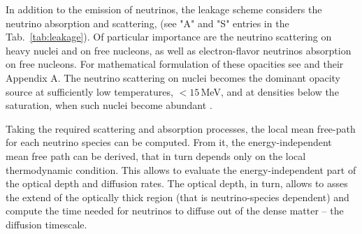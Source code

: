 In addition to the emission of neutrinos, the leakage scheme considers the neutrino absorption 
and scattering, (see "A" and "S" entries in the Tab.~\ref{tab:leakage}).
%
Of particular importance are the neutrino scattering on heavy nuclei and on free nucleons, 
as well as electron-flavor neutrinos absorption on free nucleons. 
For mathematical formulation of these opacities see \citet{Galeazzi:2013mia} 
and their Appendix A.
%
The neutrino scattering on nuclei becomes the dominant opacity source 
at sufficiently low temperatures, $<15\,$MeV, and at densities below 
the saturation, when such nuclei become abundant \citep{Rosswog:2003rv}.

Taking the required scattering and absorption processes, the local mean 
free-path for each neutrino species can be computed. From it, the 
energy-independent mean free path can be derived, that in turn depends 
only on the local thermodynamic condition. This allows to evaluate the 
energy-independent part of the optical depth and diffusion rates.
%
The optical depth, in turn, allows to asses the extend of the optically thick region 
(that is neutrino-species dependent) and compute the time needed 
for neutrinos to diffuse out of the dense matter -- the diffusion timescale. 
%

%


